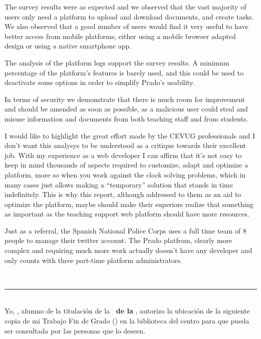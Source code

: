{{\bigskip
The survey results were as expected and we observed that the vast majority of users only need a platform to upload and download documents, and create tasks. We also observed that a good number of users would find it very useful to have better access from mobile platforms, either using a mobile browser adapted design or using a native smartphone app.

\bigskip
The analysis of the platform logs support the survey results. A minimum percentage of the platform’s features is barely used, and this could be used to deactivate some options in order to simplify Prado’s usability.

\bigskip
In terms of security we demonstrate that there is much room for improvement and should be amended as soon as possible, as a malicious user could steal and misuse information and documents from both teaching staff and from students.

\bigskip
I would like to highlight the great effort made by the CEVUG professionals and I don't want this analysys to be understood as a critique towards their excellent job. With my experience as a web developer I can affirm that it’s not easy to keep in mind thousands of aspects required to customize, adapt and optimize a platform, more so when you work against the clock solving problems, which in many cases just allows making a ``temporary'' solution that stands in time indefinitely. This is why this report, although addressed to them as an aid to optimize the platform, maybe should make their superiors realize that something as important as the teaching support web platform should have more resources.

\bigskip
Just as a referral, the Spanish National Police Corps uses a full time team of 8 people to manage their twitter account. The Prado platfrom, clearly more complex and requiring much more work actually doesn't have any developer and only counts with three part-time platform administrators. 


\newpage
\thispagestyle{empty}
\
\vspace{3cm}

\noindent\rule[-1ex]{\textwidth}{2pt}\\[4.5ex]

Yo, \textbf{\autor}, alumno de la titulación \textbf{\grado} de la \textbf{\escuela\ de la \universidad}, autorizo la ubicación de la siguiente copia de mi Trabajo Fin de Grado (\textit{\titulo}) en la biblioteca del centro para que pueda ser consultada por las personas que lo deseen.

}}
